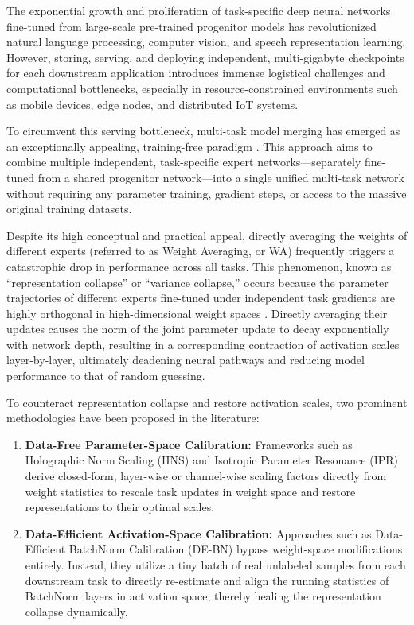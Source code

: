 \documentclass{article}
\theoremstyle{plain}
\theoremstyle{definition}
\theoremstyle{remark}
\begin{document}
The exponential growth and proliferation of task-specific deep neural networks fine-tuned from large-scale pre-trained progenitor models has revolutionized natural language processing, computer vision, and speech representation learning. However, storing, serving, and deploying independent, multi-gigabyte checkpoints for each downstream application introduces immense logistical challenges and computational bottlenecks, especially in resource-constrained environments such as mobile devices, edge nodes, and distributed IoT systems. 

To circumvent this serving bottleneck, multi-task model merging has emerged as an exceptionally appealing, training-free paradigm \cite{wortsman22, ilharco23}. This approach aims to combine multiple independent, task-specific expert networks—separately fine-tuned from a shared progenitor network—into a single unified multi-task network without requiring any parameter training, gradient steps, or access to the massive original training datasets.

Despite its high conceptual and practical appeal, directly averaging the weights of different experts (referred to as Weight Averaging, or WA) frequently triggers a catastrophic drop in performance across all tasks. This phenomenon, known as ``representation collapse'' or ``variance collapse,'' occurs because the parameter trajectories of different experts fine-tuned under independent task gradients are highly orthogonal in high-dimensional weight spaces \cite{jordan23, anonymous26a}. Directly averaging their updates causes the norm of the joint parameter update to decay exponentially with network depth, resulting in a corresponding contraction of activation scales layer-by-layer, ultimately deadening neural pathways and reducing model performance to that of random guessing.

To counteract representation collapse and restore activation scales, two prominent methodologies have been proposed in the literature:
\begin{enumerate}
    \item \textbf{Data-Free Parameter-Space Calibration:} Frameworks such as Holographic Norm Scaling (HNS) \cite{leclaire24} and Isotropic Parameter Resonance (IPR) derive closed-form, layer-wise or channel-wise scaling factors directly from weight statistics to rescale task updates in weight space and restore representations to their optimal scales.
    \item \textbf{Data-Efficient Activation-Space Calibration:} Approaches such as Data-Efficient BatchNorm Calibration (DE-BN) \cite{anonymous26a} bypass weight-space modifications entirely. Instead, they utilize a tiny batch of real unlabeled samples from each downstream task to directly re-estimate and align the running statistics of BatchNorm layers in activation space, thereby healing the representation collapse dynamically.
\end{enumerate}
\end{document}

